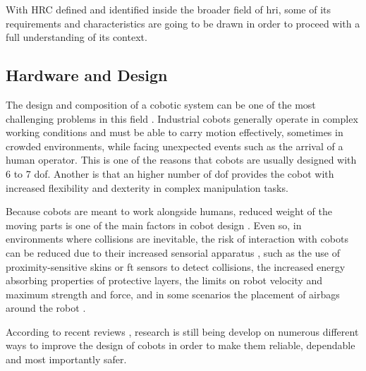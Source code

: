 
\par With HRC defined and identified inside the broader field of \ac{hri}, some of its requirements and characteristics are going to be drawn in order to proceed with a full understanding of its context.



\subsection{Hardware and Design}

\par The design and composition of a cobotic system can be one of the most challenging problems in this field \cite{handbook, cobot.design}. Industrial cobots generally operate in complex working conditions and must be able to carry motion effectively, sometimes in crowded environments, while facing unexpected events such as the arrival of a human operator. This is one of the reasons that cobots are usually designed with 6 to 7 \ac{dof}. Another is that an higher number of \ac{dof} provides the cobot with increased flexibility and dexterity in complex manipulation tasks.

\par Because cobots are meant to work alongside humans, reduced weight of the moving parts is one of the main factors in cobot design \cite{cobot.light}. Even so, in environments where collisions are inevitable, the risk of interaction with cobots can be reduced due to their increased sensorial apparatus \cite{cobot.sensor}, such as the use of proximity-sensitive skins or \ac{ft} sensors to detect collisions, the increased energy absorbing properties of protective layers, the limits on robot velocity and maximum strength and force, and in some scenarios the placement of airbags around the robot \cite{cobot.airbag}.

\par According to recent reviews \cite{paper.review.1, paper.review.2}, research is still being develop on numerous different ways to improve the design of cobots in order to make them reliable, dependable and most importantly safer.

